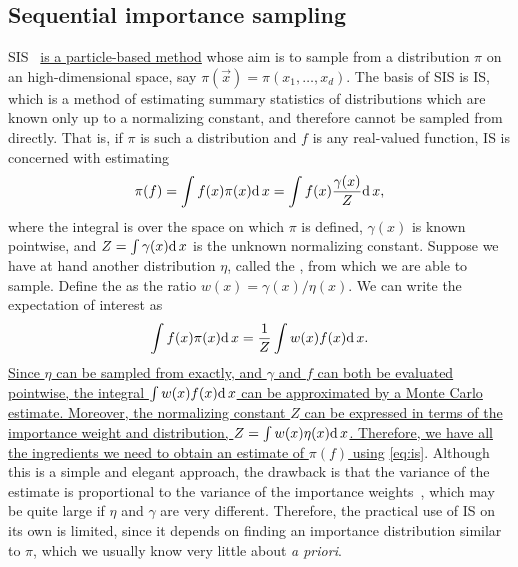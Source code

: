 \subsection{Sequential importance sampling}
\label{subsec:sis}

\Gls{SIS}~\autocite{gordon1993novel} {\color{blue}\uline{is a particle-based
method}} whose aim is to sample from a distribution $\pi$ on an
high-dimensional space, say $\pi(\vec{x}) = \pi(x_1, \ldots, x_d)$. The basis
of \gls{SIS} is \gls{IS}, which is a method of estimating summary statistics of
distributions which are known only up to a normalizing constant, and therefore
cannot be sampled from directly. That is, if $\pi$ is such a distribution and
$f$ is any real-valued function, \gls{IS} is concerned with estimating
\[
  \pi(f) = \int f(x)\pi(x)\mathrm{d}\, x = \int f(x) \frac{\gamma(x)}{Z} \mathrm{d}\, x,
\]
where the integral is over the space on which $\pi$ is defined, $\gamma(x)$ is
known pointwise, and $Z = \int \gamma(x) \mathrm{d}\, x$ is the unknown normalizing
constant. Suppose we have at hand another distribution $\eta$, called the
, from which we are able to sample. Define the
 as the ratio $w(x) = \gamma(x)/\eta(x)$. We can write
the expectation of interest as
{\color{blue}
\begin{align}
  \int f(x) \pi(x) \mathrm{d}\, x = \frac{1}{Z} \int w(x) f(x) \mathrm{d}\, x.
  \label{eq:is}
\end{align}
}
{\color{blue}\uline{
Since $\eta$ can be sampled from exactly, and $\gamma$ and $f$ can both be
evaluated pointwise, the integral $\int w(x) f(x) \mathrm{d}\, x$ can be approximated by
a Monte Carlo estimate. Moreover, the normalizing constant $Z$ can be expressed
in terms of the importance weight and distribution, $Z = \int w(x) \eta(x) \mathrm{d}\,
x$. Therefore, we have all the ingredients we need to obtain an estimate of
$\pi(f)$ using} \cref{eq:is}.} Although this is a simple and elegant approach,
the drawback is that the variance of the estimate is proportional to the
variance of the importance weights~\autocite{liu2008monte}, which may be quite
large if $\eta$ and $\gamma$ are very different. Therefore, the practical use
of \gls{IS} on its own is limited, since it depends on finding an importance
distribution similar to $\pi$, which we usually know very little about
\textit{a priori}.


